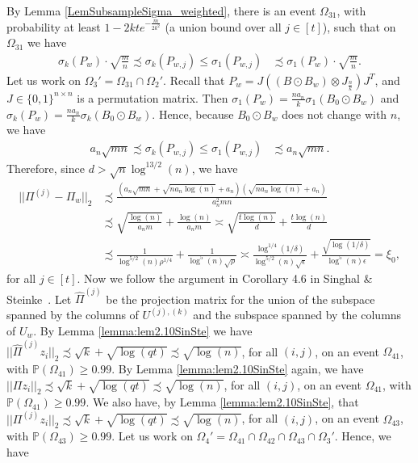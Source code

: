 \documentclass{article}
\begin{document}
By Lemma \ref{LemSubsampleSigma_weighted}, there is an event $\Omega_{31}$, with probability at least $1 - 2kte^{-\frac{m}{2k^2}}$ (a union bound over all $j \in [t]$), such that on $\Omega_{31}$ we have
\begin{align*}
\sigma_k(P_w) \cdot \sqrt{\frac{m}{n}} \precsim \sigma_{k}(P_{w, j}) \leq \sigma_{1}(P_{w, j}) & \precsim \sigma_1(P_w) \cdot \sqrt{\frac{m}{n}}.
\end{align*}
Let us work on $\Omega_3' = \Omega_{31} \cap \Omega_2'$. Recall that $P_w = J((B\odot B_w) \otimes J_{\frac{n}{k}})J^T$, and $J \in \{0, 1\}^{n \times n}$ is a permutation matrix. Then $\sigma_1(P_w) = \frac{na_n}{k}\sigma_1(B_0 \odot B_w)$ and $\sigma_k(P_w) = \frac{na_n}{k}\sigma_k(B_0 \odot B_w)$. Hence, because $B_0 \odot B_w$ does not change with $n$, we have
\begin{align*}
a_n \sqrt{mn} \precsim \sigma_{k}(P_{w, j}) \leq \sigma_{1}(P_{w, j}) & \precsim a_n \sqrt{mn}.
\end{align*}
Therefore, since $d > \sqrt{n}\log^{13/2}(n)$, we have
\begin{align*}
||\Pi^{(j)} - \Pi_w||_2 &\precsim \frac{(a_n \sqrt{mn} + \sqrt{na_n \log(n)} + a_n)(\sqrt{na_n\log(n)} + a_n)}{a_n^2mn} \\
%
& \precsim \sqrt{\frac{\log(n)}{a_n m}} + \frac{\log(n)}{a_n m} \asymp \sqrt{\frac{t\log(n)}{d}} + \frac{t\log(n)}{d}\\
&\precsim \frac{1}{\log^{5/2}(n)\rho^{1/4}} + \frac{1}{\log^5(n)\sqrt{\rho}} \asymp \frac{\log^{1/4}(1/\delta)}{\log^{5/2}(n)\sqrt{\epsilon}} + \frac{\sqrt{\log(1/\delta)}}{\log^5(n)\epsilon} = \xi_0,
\end{align*}
for all $j \in [t]$. Now we follow the argument in Corollary 4.6 in Singhal \& Steinke~\cite{SinSte21}.
Let $\hat{\Pi}^{(j)}$ be the projection matrix for the union of the subspace spanned by the columns of $U^{(j), (k)}$ and the subspace spanned
by the columns of $U_w$. By Lemma \ref{lemma:lem2.10SinSte} we have $||\hat{\Pi}^{(j)}z_i||_2 \precsim \sqrt{k} + \sqrt{\log(qt)} \precsim \sqrt{\log(n)}$, for all $(i, j)$, on an event $\Omega_{41}$, with $\mathbb{P}(\Omega_{41}) \geq 0.99$. By Lemma \ref{lemma:lem2.10SinSte} again, we have $||\Pi z_i||_2 \precsim \sqrt{k} + \sqrt{\log(qt)} \precsim \sqrt{\log(n)}$, for all $(i, j)$, on an event $\Omega_{41}$, with $\mathbb{P}(\Omega_{41}) \geq 0.99$. We also have, by Lemma \ref{lemma:lem2.10SinSte}, that $||\Pi^{(j)}z_i||_2 \precsim \sqrt{k} + \sqrt{\log(qt)} \precsim \sqrt{\log(n)}$, for all $(i, j)$, on an event $\Omega_{43}$, with $\mathbb{P}(\Omega_{43}) \geq 0.99$. Let us work on $\Omega_4' = \Omega_{41} \cap \Omega_{42} \cap \Omega_{43} \cap \Omega_3'$. Hence, we have
\end{document}

